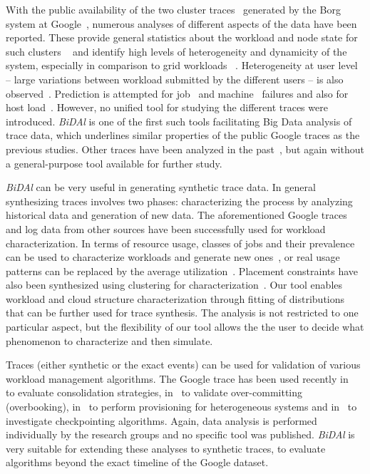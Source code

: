 \documentclass{article}
\begin{document}
With the public availability of the two cluster traces~\cite{googleData} generated by the Borg system at Google~\cite{verma2015}, numerous analyses of different aspects of the data have been reported. These provide general statistics about the workload and node state for such clusters ~\cite{Liu2012,Reiss2012,Reiss2012a} and identify high levels of heterogeneity and dynamicity of the system, especially in comparison to grid workloads ~\cite{Di2012}. Heterogeneity at user level -- large variations between workload submitted by the different users  -- is also observed~\cite{abdul2014}. Prediction is attempted for job~\cite{guan2013} and machine~\cite{sirbu2015} failures and also for host load~\cite{di2012host}. However, no unified tool for studying the different traces were introduced. \emph{BiDAl} is one of the first such tools facilitating Big Data analysis of trace data, which underlines similar properties of the public Google traces as the previous studies. Other traces have been analyzed in the past~\cite{Kavulya2010,Chen2011,Chen2012}, but again without a general-purpose tool available for further study.

\emph{BiDAl} can be very useful in generating synthetic trace data. In general synthesizing traces involves two phases: characterizing the process by analyzing historical data and generation of new data. The aforementioned Google traces and log data from other sources have been successfully used for workload characterization. In terms of resource usage, classes of jobs and their prevalence can be used to characterize workloads and generate new ones~\cite{Mishra2010,Wang2011}, or real usage patterns can be replaced by the average utilization~\cite{Zhang2011}. Placement constraints have also been synthesized using clustering for characterization~\cite{Sharma2011}. Our tool enables workload and cloud structure characterization through fitting of distributions that can be further used for trace synthesis. The analysis is not restricted to one particular aspect, but the flexibility of our tool allows the the user to decide what phenomenon to characterize and then simulate.

Traces (either synthetic or the exact events) can be used for validation of various workload management algorithms. The Google trace has been used recently in~\cite{iglesias2014} to evaluate consolidation strategies, in~\cite{breitgand2014,caglar2014} to validate over-committing (overbooking), in~\cite{zhang2014dynamic} to perform provisioning for heterogeneous systems and in~\cite{di2013optimization} to investigate checkpointing algorithms. Again, data analysis is performed individually by the research groups and no specific tool was published. \emph{BiDAl} is very suitable for extending these analyses to synthetic traces, to evaluate algorithms beyond the exact timeline of the Google dataset.
\end{document}
